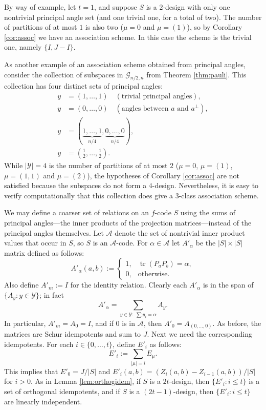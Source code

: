 \documentclass[12pt]{article}
\numberwithin{equation}{section}
\theoremstyle{plainsl}
\newcommand\al{\alpha}
\newcommand\gras[2]{\mathcal{G}_{#1,#2}}
\newcommand\scr[1]{{\mathcal#1}}
\newcommand\abs[1]{\left|#1\right|}
\newcommand\opk[1]{\mathop{\mathrm{#1}}\nolimits}
\newcommand\tr{\opk{tr}}
\begin{document}
By way of example, let $t = 1$, and suppose $S$ is a $2$-design with only one nontrivial principal angle set (and one trivial one, for a total of two). The number of partitions of at most $1$ is also two ($\mu = 0$ and $\mu = (1)$), so by Corollary \ref{cor:assoc} we have an association scheme. In this case the scheme is the trivial one, namely $\{I, J-I\}$.

As another example of an association scheme obtained from principal angles, consider the collection of subspaces in $\gras{n/2}{n}$ from Theorem \ref{thm:pauli}. This collection has four distinct sets of principal angles: 
\begin{align*}
y & = (1,\ldots,1) \quad (\text{trivial principal angles}), \\
y & = (0,\ldots,0) \quad (\text{angles between $a$ and $a^\perp$}), \\
y & = (\underbrace{1,\ldots,1}_{n/4},\underbrace{0,\ldots,0}_{n/4}), \\ 
y & = (\tfrac{1}{2},\ldots,\tfrac{1}{2}).
\end{align*}
While $|\scr{Y}| = 4$ is the number of partitions of at most $2$ ($\mu = 0$, $\mu = (1)$, $\mu = (1,1)$ and $\mu = (2)$), the hypotheses of Corollary \ref{cor:assoc} are not satisfied because the subspaces do not form a $4$-design. Nevertheless, it is easy to verify computationally that this collection does give a $3$-class association scheme.

We may define a coarser set of relations on an $f$-code $S$ using the sums of principal angles---the inner products of the projection matrices---instead of the principal angles themselves. Let $\scr{A}$ denote the set of nontrivial inner product values that occur in $S$, so $S$ is an $\scr{A}$-code. For $\al \in \scr{A}$ let $A'_\al$ be the $|S| \times |S|$ matrix defined as follows:
\[
A'_\al(a,b) := \begin{cases}
1, & \tr(P_aP_b) = \al, \\
0, & \mbox{otherwise.}
           \end{cases}
\]
Also define $A'_m := I$ for the identity relation. Clearly each $A'_\al$ is in the span of $\{A_y: y \in \scr{Y}\}$; in fact
\[
A'_\al = \sum_{y \in \scr{Y}:\; \sum y_i = \al} A_y.
\]
In particular, $A'_m = A_0 = I$, and if $0$ is in $\scr{A}$, then $A'_0 = A_{(0,\ldots,0)}$. As before, the matrices are Schur idempotents and sum to $J$. Next we need the corresponding idempotents. For each $i \in \{0,\ldots,t\}$, define $E'_i$ as follows:
\[
E'_i := \sum_{\abs{\mu} = i} E_\mu.
\]
This implies that $E'_0 = J/|S|$ and $E'_i(a,b) = (Z_i(a,b) - Z_{i-1}(a,b))/|S|$ for $i > 0$. As in Lemma \ref{lem:orthogidem}, if $S$ is a $2t$-design, then $\{E'_i: i \leq t\}$ is a set of orthogonal idempotents, and if $S$ is a $(2t-1)$-design, then $\{E'_i: i \leq t\}$ are linearly independent.
\end{document}
